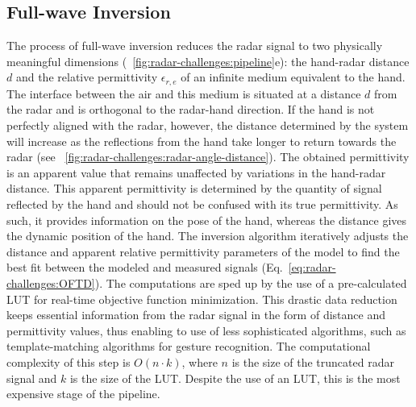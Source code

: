 \subsection{Full-wave Inversion}\label{sec:radar-challenges:processing-strategy:inversion}
The process of full-wave inversion reduces the radar signal to two physically meaningful dimensions (\fig~\ref{fig:radar-challenges:pipeline}e): the hand-radar distance $d$ and the relative permittivity $\epsilon_{r,e}$ of an infinite medium equivalent to the hand. The interface between the air and this medium is situated at a distance $d$ from the radar and is orthogonal to the radar-hand direction. 
If the hand is not perfectly aligned with the radar, however, the distance determined by the system will increase as the reflections from the hand take longer to return towards the radar (see \fig~\ref{fig:radar-challenges:radar-angle-distance}).
%
The obtained permittivity is an apparent value that remains unaffected by variations in the hand-radar distance. This apparent permittivity is determined by the quantity of signal reflected by the hand and should not be confused with its true permittivity. As such, it provides information on the pose of the hand, whereas the distance gives the dynamic position of the hand.
The inversion algorithm iteratively adjusts the distance and apparent relative permittivity parameters of the model to find the best fit between the modeled and measured signals (Eq.~\ref{eq:radar-challenges:OFTD}). The computations are sped up by the use of a pre-calculated LUT for real-time objective function minimization. 
This drastic data reduction keeps essential information from the radar signal in the form of distance and permittivity values, thus enabling to use of less sophisticated algorithms, such as template-matching algorithms for gesture recognition. 
%
The computational complexity of this step is $O(n \cdot k)$, where $n$ is the size of the truncated radar signal and $k$ is the size of the LUT. Despite the use of an LUT, this is the most expensive stage of the pipeline.

